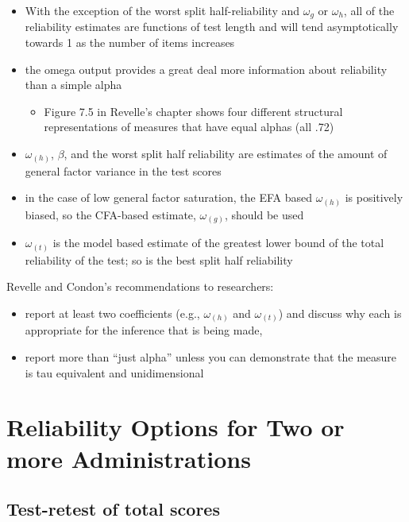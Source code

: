 \documentclass[
  english,
]{book}
\providecommand{\tightlist}{%
  \setlength{\itemsep}{0pt}\setlength{\parskip}{0pt}}
\begin{document}
\begin{itemize}
\tightlist
\item
  With the exception of the worst split half-reliability and \(\omega_{g}\) or \(\omega_{h}\), all of the reliability estimates are functions of test length and will tend asymptotically towards 1 as the number of items increases
\item
  the omega output provides a great deal more information about reliability than a simple alpha

  \begin{itemize}
  \tightlist
  \item
    Figure 7.5 in Revelle's chapter shows four different structural representations of measures that have equal alphas (all .72)
  \end{itemize}
\item
  \(\omega_{(h)}\), \(\beta\), and the worst split half reliability are estimates of the amount of general factor variance in the test scores
\item
  in the case of low general factor saturation, the EFA based \(\omega_{(h)}\) is positively biased, so the CFA-based estimate, \(\omega_{(g)}\), should be used
\item
  \(\omega_{(t)}\) is the model based estimate of the greatest lower bound of the total reliability of the test; so is the best split half reliability
\end{itemize}

Revelle and Condon's \citep{revelle_reliability_2019} recommendations to researchers:

\begin{itemize}
\tightlist
\item
  report at least two coefficients (e.g., \(\omega_{(h)}\) and \(\omega_{(t)}\)) and discuss why each is appropriate for the inference that is being made,
\item
  report more than ``just alpha'' unless you can demonstrate that the measure is tau equivalent and unidimensional
\end{itemize}

\hypertarget{reliability-options-for-two-or-more-administrations}{%
\section{Reliability Options for Two or more Administrations}\label{reliability-options-for-two-or-more-administrations}}

\hypertarget{test-retest-of-total-scores}{%
\subsection{Test-retest of total scores}\label{test-retest-of-total-scores}}
\end{document}
